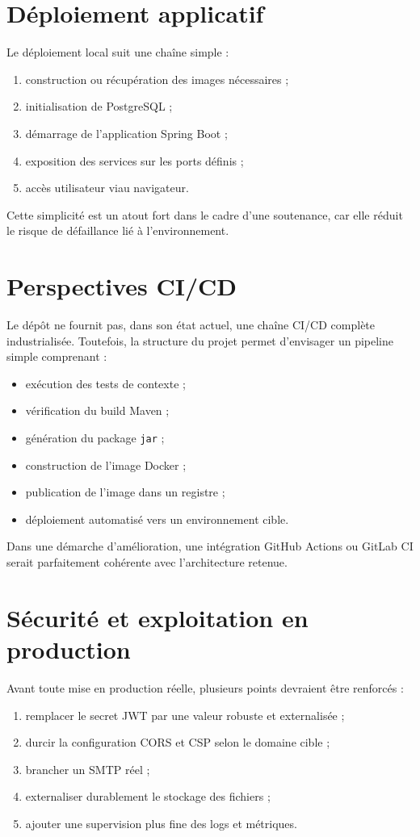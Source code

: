 ﻿\documentclass[12pt,a4paper,oneside]{report}
\begin{document}
\section{Déploiement applicatif}
Le déploiement local suit une chaîne simple :
\begin{enumerate}
  \item construction ou récupération des images nécessaires ;
  \item initialisation de PostgreSQL ;
  \item démarrage de l'application Spring Boot ;
  \item exposition des services sur les ports définis ;
  \item accès utilisateur viau navigateur.
\end{enumerate}

Cette simplicité est un atout fort dans le cadre d'une soutenance, car elle réduit le risque de défaillance lié à l'environnement.

\section{Perspectives CI/CD}
Le dépôt ne fournit pas, dans son état actuel, une chaîne CI/CD complète industrialisée. Toutefois, la structure du projet permet d'envisager un pipeline simple comprenant :
\begin{itemize}
  \item exécution des tests de contexte ;
  \item vérification du build Maven ;
  \item génération du package \texttt{jar} ;
  \item construction de l'image Docker ;
  \item publication de l'image dans un registre ;
  \item déploiement automatisé vers un environnement cible.
\end{itemize}

Dans une démarche d'amélioration, une intégration GitHub Actions ou GitLab CI serait parfaitement cohérente avec l'architecture retenue.

\section{Sécurité et exploitation en production}
Avant toute mise en production réelle, plusieurs points devraient être renforcés :
\begin{enumerate}
  \item remplacer le secret JWT par une valeur robuste et externalisée ;
  \item durcir la configuration CORS et CSP selon le domaine cible ;
  \item brancher un SMTP réel ;
  \item externaliser durablement le stockage des fichiers ;
  \item ajouter une supervision plus fine des logs et métriques.
\end{enumerate}
\end{document}
